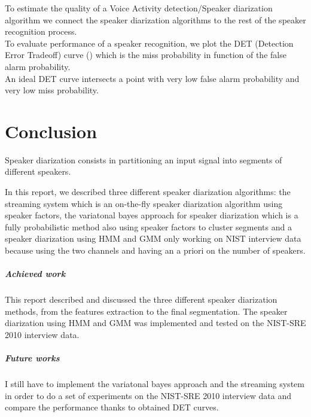 \documentclass{techrep} %
\begin{document}
To estimate the quality of a Voice Activity detection/Speaker
diarization algorithm we connect the speaker diarization algorithms to
the rest of the speaker recognition process.\\ To evaluate performance
of a speaker recognition, we plot the DET (Detection Error Tradeoff)
curve (\cite{DET}) which is the miss probability in function of the
false alarm probability.\\ An ideal DET curve intersects a point with
very low false alarm probability and very low miss probability.


\chapter{Conclusion}

Speaker diarization consists in partitioning an input signal into
segments of different speakers.

In this report, we described three different speaker diarization
algorithms: the streaming system which is an on-the-fly speaker
diarization algorithm using speaker factors, the variatonal bayes
approach for speaker diarization which is a fully probabilistic method
also using speaker factors to cluster segments and a speaker
diarization using HMM and GMM only working on NIST interview data
because using the two channels and having an a priori on the number of
speakers.

\paragraph{Achieved work} This report described and discussed the three different speaker diarization methods, from the features extraction to the final segmentation. The speaker diarization using HMM and GMM was implemented and tested on the NIST-SRE 2010 interview data.

\paragraph{Future works} I still have to implement the variatonal bayes approach and the streaming system in order to do a set of experiments on the NIST-SRE 2010 interview data and compare the performance thanks to obtained DET curves.

 \nocite{*}
\end{document}
